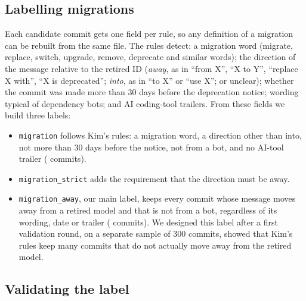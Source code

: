 \subsection{Labelling migrations}\label{sec:labels}

Each candidate commit gets one field per rule, so any definition of a migration can be rebuilt from the same file. The rules detect: a migration word (migrate, replace, switch, upgrade, remove, deprecate and similar words); the direction of the message relative to the retired ID (\emph{away}, as in ``from X'', ``X to Y'', ``replace X with'', ``X is deprecated''; \emph{into}, as in ``to X'' or ``use X''; or unclear); whether the commit was made more than 30 days before the deprecation notice; wording typical of dependency bots; and AI coding-tool trailers. From these fields we build three labels:

\begin{itemize}
\item \texttt{migration} follows Kim's rules: a migration word, a direction other than into, not more than 30 days before the notice, not from a bot, and no AI-tool trailer (\KimMigration{} commits).
\item \texttt{migration\_strict} adds the requirement that the direction must be away.
\item \texttt{migration\_away}, our main label, keeps every commit whose message moves away from a retired model and that is not from a bot, regardless of its wording, date or trailer (\MigrationsAway{} commits). We designed this label after a first validation round, on a separate sample of 300 commits, showed that Kim's rules keep many commits that do not actually move away from the retired model.
\end{itemize}


\subsection{Validating the label}

